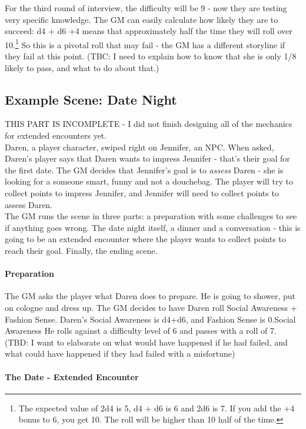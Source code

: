 \documentclass{LegrandOrangeTufteBook}
\newcommand{\termCore}[1]{\textcolor{colorCoreCompetency}{#1}}
\newcommand{\term}[1]{\textcolor{colorTerm}{#1}}
\begin{document}
For the third round of interview, the difficulty will be 9 - now they are testing very specific knowledge. The GM can easily calculate how likely they are to succeed: d4 + d6 +4 means that approximately half the time they will roll over 10.\footnote{The expected value of 2d4 is 5, d4 + d6 is 6 and 2d6 is 7. If you add the +4 bonus to 6, you get 10. The roll will be higher than 10 half of the time.} So this is a pivotal roll that may fail - the GM has a different storyline if they fail at this point. (TBC: I need to explain how to know that she is only 1/8 likely to pass, and what to do about that.)\\


\subsection*{Example Scene: Date Night}

THIS PART IS INCOMPLETE - I did not finish designing all of the mechanics for extended encounters yet.\\

Daren, a player character, swiped right on Jennifer, an NPC. When asked, Daren's player says that Daren wants to
impress Jennifer - that's their goal for the first date. The GM decides that Jennifer's goal is to \emph{assess} Daren
- she is looking for a someone smart, funny and not a douchebag.
 The player will try to collect points to impress Jennifer, and Jennifer will need to collect points to assess Daren. \\

The GM runs the scene in three parts: a preparation with some challenges to see if anything goes wrong. The date night itself,
a dinner and a conversation - this is going to be an extended encounter where the player wants to collect points to reach their
goal. Finally, the ending scene.

\paragraph*{Preparation}
The GM asks the player what Daren does to prepare. He is going to shower, put on cologne and dress up. The GM
decides to have Daren roll \termCore{Social Awareness} + Fashion Sense.
Daren's \termCore{Social Awareness} is d4+d6, and Fashion Sense is 0.\termCore{Social Awareness}
He rolls against a \term{difficulty level} of 6 and passes with a roll of 7. \\

(TBD: I want to elaborate on what would have happened if he had failed, and what could have happened if they had failed with a \term{misfortune})

\paragraph*{The Date - Extended Encounter}

\end{document}
